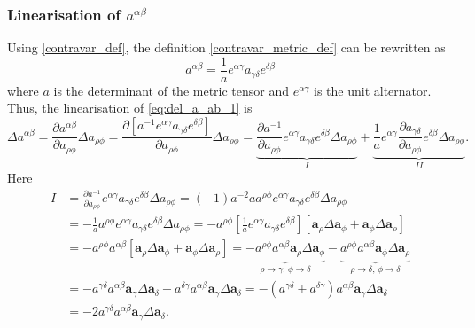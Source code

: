 \documentclass[../main.tex]{subfiles}
\begin{document}
\begin{appendices}
\subsubsection{Linearisation of \texorpdfstring{$a^{\alpha \beta}$}{contravariant metric}}
Using \eqref{contravar_def}, the definition \eqref{contravar_metric_def} can be rewritten as
\begin{equation}\label{eq:del_a_ab_1}
    a^{\alpha \beta} = \frac{1}{a} e^{\alpha \gamma} a_{\gamma \delta} e^{\delta \beta}
\end{equation}
where $a$ is the determinant of the metric tensor and $e^{\alpha \gamma}$ is the unit alternator.
Thus, the linearisation of \eqref{eq:del_a_ab_1} is
\begin{equation}\label{eq:del_a_ab_2}
    \Delta a^{\alpha \beta} = \frac{\partial a^{\alpha \beta}}{\partial a_{\rho \phi}} \Delta a_{\rho \phi} = \frac{\partial \left[ a^{-1} e^{\alpha \gamma} a_{\gamma \delta} e^{\delta \beta} \right]}{\partial a_{\rho \phi}} \Delta a_{\rho \phi} = \underbrace{\frac{\partial a^{-1}}{\partial a_{\rho \phi}} e^{\alpha \gamma} a_{\gamma \delta} e^{\delta \beta} \Delta a_{\rho \phi}}_{I} + \underbrace{\frac{1}{a} e^{\alpha \gamma} \frac{\partial a_{\gamma \delta}}{\partial a_{\rho \phi}} e^{\delta \beta} \Delta a_{\rho \phi}}_{II}.
\end{equation}
Here
\begin{equation}\label{eq:del_a_ab_3}
    \begin{split}
        I &= \frac{\partial a^{-1}}{\partial a_{\rho \phi}} e^{\alpha \gamma} a_{\gamma \delta} e^{\delta \beta} \Delta a_{\rho \phi} = \left( -1 \right) a^{-2} a a^{\rho \phi} e^{\alpha \gamma} a_{\gamma \delta} e^{\delta \beta} \Delta a_{\rho \phi} \\ &= - \frac{1}{a} a^{\rho \phi} e^{\alpha \gamma} a_{\gamma \delta} e^{\delta \beta} \Delta a_{\rho \phi} = - a^{\rho \phi} \left[ \frac{1}{a} e^{\alpha \gamma} a_{\gamma \delta} e^{\delta \beta} \right] \left[ \boldsymbol{a}_{\rho} \Delta \boldsymbol{a}_{\phi} + \boldsymbol{a}_{\phi} \Delta \boldsymbol{a}_{\rho} \right] \\ &= - a^{\rho \phi} a^{\alpha \beta} \left[ \boldsymbol{a}_{\rho} \Delta \boldsymbol{a}_{\phi} + \boldsymbol{a}_{\phi} \Delta \boldsymbol{a}_{\rho} \right] = \underbrace{- a^{\rho \phi} a^{\alpha \beta} \boldsymbol{a}_{\rho} \Delta \boldsymbol{a}_{\phi}}_{\rho \rightarrow \gamma, \, \phi \rightarrow \delta} - \underbrace{a^{\rho \phi} a^{\alpha \beta} \boldsymbol{a}_{\phi} \Delta \boldsymbol{a}_{\rho}}_{\rho \rightarrow \delta, \, \phi \rightarrow \delta} \\ &= - a^{\gamma \delta} a^{\alpha \beta} \boldsymbol{a}_{\gamma} \Delta \boldsymbol{a}_{\delta} - a^{\delta \gamma} a^{\alpha \beta} \boldsymbol{a}_{\gamma} \Delta \boldsymbol{a}_{\delta} = - \left( a^{\gamma \delta} + a^{\delta \gamma} \right) a^{\alpha \beta} \boldsymbol{a}_{\gamma} \Delta \boldsymbol{a}_{\delta} \\ &= - 2 a^{\gamma \delta} a^{\alpha \beta} \boldsymbol{a}_{\gamma} \Delta \boldsymbol{a}_{\delta}.
\end{split}
\end{equation}


\end{appendices}
\end{document}
